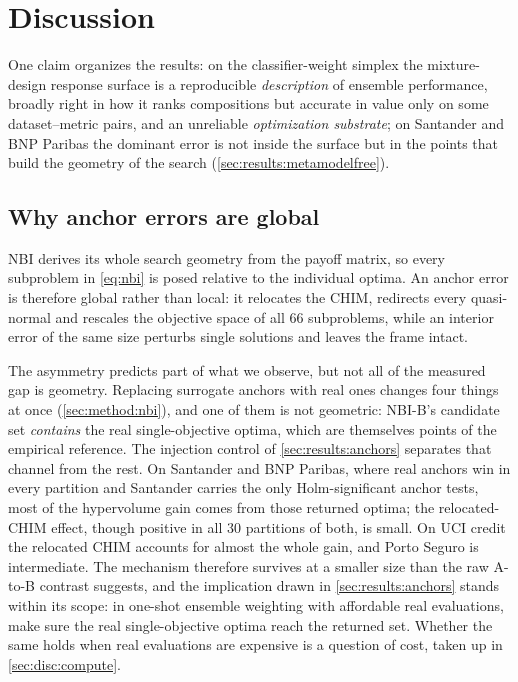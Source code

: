 \section{Discussion}
\label{sec:discussion}

One claim organizes the results: on the classifier-weight simplex the mixture-design response surface is a
reproducible \emph{description} of ensemble performance, broadly right in how it ranks compositions but accurate in
value only on some dataset--metric pairs, and an unreliable \emph{optimization substrate}; on Santander and BNP
Paribas the dominant error is not inside the surface but in the points that build the geometry of the search
(\cref{sec:results:metamodelfree}).

\subsection{Why anchor errors are global}
\label{sec:disc:anchors}

NBI derives its whole search geometry from the payoff matrix, so every subproblem in \cref{eq:nbi} is posed relative
to the individual optima. An anchor error is therefore global rather than local: it relocates the CHIM, redirects
every quasi-normal and rescales the objective space of all 66 subproblems, while an interior error of the same size
perturbs single solutions and leaves the frame intact.

The asymmetry predicts part of what we observe, but not all of the measured gap is geometry. Replacing surrogate
anchors with real ones changes four things at once (\cref{sec:method:nbi}), and one of them is not geometric: NBI-B's
candidate set \emph{contains} the real single-objective optima, which are themselves points of the empirical
reference. The injection control of \cref{sec:results:anchors} separates that channel from the rest. On Santander and
BNP Paribas, where real anchors win in every partition and Santander carries the only Holm-significant anchor tests,
most of the hypervolume gain comes from those returned optima; the relocated-CHIM effect, though positive in all 30
partitions of both, is small. On UCI credit the relocated CHIM accounts for almost the whole gain, and Porto Seguro is
intermediate. The mechanism therefore survives at a smaller size than the raw A-to-B contrast suggests, and the
implication drawn in \cref{sec:results:anchors} stands within its scope: in one-shot ensemble weighting with
affordable real evaluations, make sure the real single-objective optima reach the returned set. Whether the same
holds when real evaluations are expensive is a question of cost, taken up in \cref{sec:disc:compute}.

